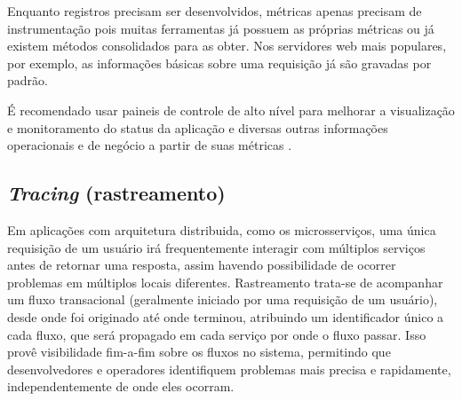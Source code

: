 Enquanto registros precisam ser desenvolvidos, métricas apenas precisam de instrumentação pois muitas ferramentas já possuem as próprias métricas ou já existem métodos consolidados para as obter. Nos servidores web mais populares, por exemplo, as informações básicas sobre uma requisição já são gravadas por padrão.

É recomendado usar paineis de controle de alto nível para melhorar a visualização e monitoramento do status da aplicação e diversas outras informações operacionais e de negócio a partir de suas métricas \cite{martin-fowler-microservices}.

\subsection{\emph{Tracing} (rastreamento)}
Em aplicações com arquitetura distribuida, como os microsserviços, uma única requisição de um usuário irá frequentemente interagir com múltiplos serviços antes de retornar uma resposta, assim havendo possibilidade de ocorrer problemas em múltiplos locais diferentes. Rastreamento trata-se de acompanhar um fluxo transacional (geralmente iniciado por uma requisição de um usuário), desde onde foi originado até onde terminou, atribuindo um identificador único a cada fluxo, que será propagado em cada serviço por onde o fluxo passar. Isso provê visibilidade fim-a-fim sobre os fluxos no sistema, permitindo que desenvolvedores e operadores identifiquem problemas mais precisa e rapidamente, independentemente de onde eles ocorram. 







